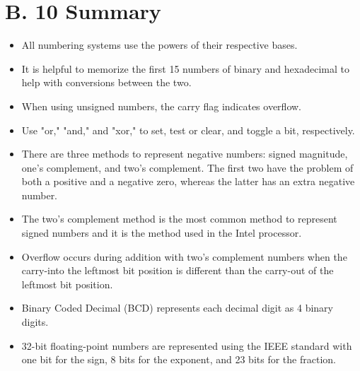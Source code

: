 \documentclass[10pt]{book}
\begin{document}
\section{B. 10 Summary}
\begin{itemize}
  \item All numbering systems use the powers of their respective bases.
  \item It is helpful to memorize the first 15 numbers of binary and hexadecimal to help with conversions between the two.
  \item When using unsigned numbers, the carry flag indicates overflow.
  \item Use "or," "and," and "xor," to set, test or clear, and toggle a bit, respectively.
  \item There are three methods to represent negative numbers: signed magnitude, one's complement, and two's complement. The first two have the problem of both a positive and a negative zero, whereas the latter has an extra negative number.
  \item The two's complement method is the most common method to represent signed numbers and it is the method used in the Intel processor.
  \item Overflow occurs during addition with two's complement numbers when the carry-into the leftmost bit position is different than the carry-out of the leftmost bit position.
  \item Binary Coded Decimal (BCD) represents each decimal digit as 4 binary digits.
  \item 32-bit floating-point numbers are represented using the IEEE standard with one bit for the sign, 8 bits for the exponent, and 23 bits for the fraction.
\end{itemize}
\end{document}
